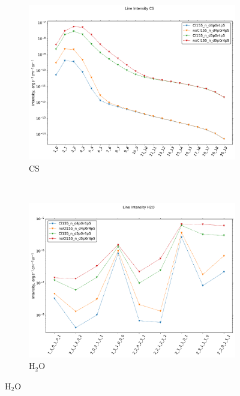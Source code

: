 \begin{figure}[!htbp]
    \centering
    \begin{subfigure}[t]{0.45\textwidth} %
        \centering \includegraphics[trim = {0 0 0 1.5cm},clip,width=1\textwidth]{figure/Cl/gridModelEmiss/I_comp_CS.pdf}
        \caption{$\mathrm{CS}$}
    \end{subfigure}
    ~ 
   \begin{subfigure}[t]{0.45\textwidth} %
        \centering \includegraphics[trim = {0 0 0 1.5cm},clip,width=1\textwidth]{figure/Cl/gridModelEmiss/I_comp_H2O.pdf}
        \caption{$\mathrm{H}_2\mathrm{O}$}
    \end{subfigure}
    

\end{figure}
